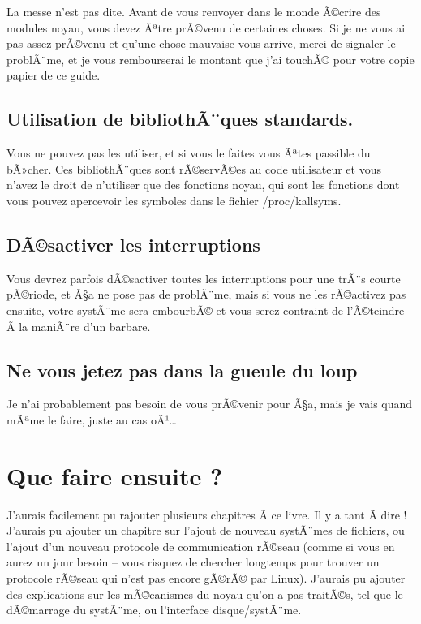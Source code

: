 \documentclass[11pt]{article}
\begin{document}
La messe n'est pas dite. Avant de vous renvoyer dans le monde Ã©crire des modules noyau, vous devez Ãªtre prÃ©venu de certaines choses. Si je ne vous ai pas assez prÃ©venu et qu'une chose mauvaise vous arrive, merci de signaler le problÃ¨me, et je vous rembourserai le montant que j'ai touchÃ© pour votre copie papier de ce guide.

\subsection*{Utilisation de bibliothÃ¨ques standards.}
\label{sec-19-1}

Vous ne pouvez pas les utiliser, et si vous le faites vous Ãªtes passible du bÃ»cher. Ces bibliothÃ¨ques sont rÃ©servÃ©es au code utilisateur et vous n'avez le droit de n'utiliser que des fonctions noyau, qui sont les fonctions dont vous pouvez apercevoir les symboles dans le fichier /proc/kallsyms.

\subsection*{DÃ©sactiver les interruptions}
\label{sec-19-2}
Vous devrez parfois dÃ©sactiver toutes les interruptions pour une trÃ¨s courte pÃ©riode, et Ã§a ne pose pas de problÃ¨me, mais si vous ne les rÃ©activez pas ensuite, votre systÃ¨me sera embourbÃ© et vous serez contraint de l'Ã©teindre Ã  la maniÃ¨re d'un barbare.

\subsection*{Ne vous jetez pas dans la gueule du loup}
\label{sec-19-3}

Je n'ai probablement pas besoin de vous prÃ©venir pour Ã§a, mais je vais quand mÃªme le faire, juste au cas oÃ¹\ldots{}

\section*{Que faire ensuite ?}
\label{sec-20}

J'aurais facilement pu rajouter plusieurs chapitres Ã  ce livre. Il y a tant Ã  dire ! J'aurais pu ajouter un chapitre sur l'ajout de nouveau systÃ¨mes de fichiers, ou l'ajout d'un nouveau protocole de communication rÃ©seau (comme si vous en aurez un jour besoin -- vous risquez de chercher longtemps pour trouver un protocole rÃ©seau qui n'est pas encore gÃ©rÃ© par Linux). J'aurais pu ajouter des explications sur les mÃ©canismes du noyau qu'on a pas traitÃ©s, tel que le dÃ©marrage du systÃ¨me, ou l'interface disque/systÃ¨me.
\end{document}
